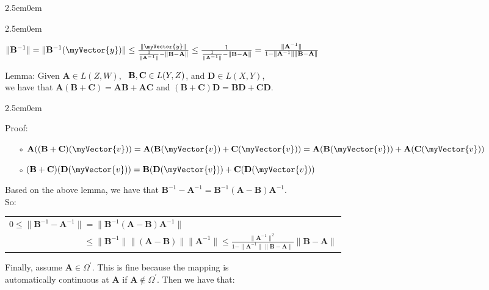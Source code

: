 \documentclass{book}
\newcommand{\hFour}{%
   \color{Cerulean}
   \fontsize{12}{14}\selectfont%
}
\newenvironment{myIndent}{%
   \begin{adjustwidth}{2.5em}{0em}%
}{%
   \end{adjustwidth}%
}
\newcommand{\uuline}[2][.]{%
{\vphantom{a}\color{#1}%
\rlap{\rule[-0.18em]{\widthof{#2}}{0.06em}}%
\rlap{\rule[-0.32em]{\widthof{#2}}{0.06em}}}%
#2}
\newcommand{\myHS}{ \hspace{0.5em}}
\newcommand{\retTwo}{\hfill\bigbreak}
\newcommand{\mVec}[1]{\myVector{#1}}
\newcommand{\mMat}[1]{\mathbf{#1}}
\begin{document}
{\begin{myIndent}
\begin{itemize}
{\begin{myIndent}
         {\center $ \|\mMat{B}^{-1}\| = \|\mMat{B}^{-1}(\mVec{y})\| \leq \frac{\|\mVec{y}\|}{\frac{1}{\|\mMat{A}^{-1}\|} - \|\mMat{B} - \mMat{A}\|} \leq \frac{1}{\frac{1}{\|\mMat{A}^{-1}\|} - \|\mMat{B} - \mMat{A}\|} = \frac{\|\mMat{A}^{-1}\|}{1 - \|\mMat{A}^{-1}\|\|\mMat{B} - \mMat{A}\|}$ \retTwo\par}

         \uuline{Lemma}: Given $\mMat{A} \in L(Z, W)$, $\myHS\mMat{B}, \mMat{C} \in L(Y, Z)$, and $\mMat{D} \in L(X, Y)$,\\ we have that $\mMat{A}(\mMat{B} + \mMat{C}) = \mMat{A}\mMat{B} + \mMat{A}\mMat{C}$ and $(\mMat{B} + \mMat{C})\mMat{D} = \mMat{B}\mMat{D} + \mMat{C}\mMat{D}$.
         {\begin{myIndent}\hFour
            Proof:
            \begin{itemize}
               \item[$\circ$] $\mMat{A}((\mMat{B} + \mMat{C})(\mVec{v})) = \mMat{A}(\mMat{B}(\mVec{v}) + \mMat{C}(\mVec{v})) = \mMat{A}(\mMat{B}(\mVec{v})) + \mMat{A}(\mMat{C}(\mVec{v}))$
               \item[$\circ$] $ (\mMat{B} + \mMat{C})(\mMat{D}(\mVec{v})) =  \mMat{B}(\mMat{D}(\mVec{v})) + \mMat{C}(\mMat{D}(\mVec{v}))$\\
            \end{itemize}
         \end{myIndent}}

         Based on the above lemma, we have that $\mMat{B}^{-1} - \mMat{A}^{-1} = \mMat{B}^{-1}(\mMat{A} - \mMat{B})\mMat{A}^{-1}$.\\ So:\\ [-26pt]
         \begin{center}
            \begin{tabular}{l}
               $0 \leq \|\mMat{B}^{-1} - \mMat{A}^{-1}\| = \|\mMat{B}^{-1}(\mMat{A} - \mMat{B})\mMat{A}^{-1}\|$ \\
               $\phantom{0 \leq \|\mMat{B}^{-1} - \mMat{A}^{-1}\|} \leq \|\mMat{B}^{-1}\|\|(\mMat{A} - \mMat{B})\|\|\mMat{A}^{-1}\| \leq \frac{\|\mMat{A}^{-1}\|^2}{1 - \|\mMat{A}^{-1}\|\|\mMat{B} - \mMat{A}\|}\|\mMat{B} - \mMat{A}\|$
            \end{tabular}
         \end{center}

         \newpage

         Finally, assume $\mMat{A} \in \Omega^\prime$. This is fine because the mapping is\\ automatically continuous at $\mMat{A}$ if $\mMat{A} \notin \Omega^\prime$. Then we have that:
         

\end{myIndent}}
\end{itemize}
\end{myIndent}}
\end{document}
